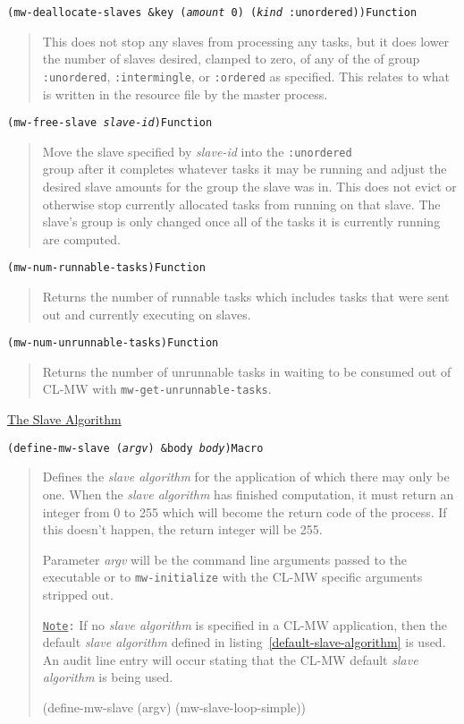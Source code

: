 \documentclass[titlepage,12pt]{book}
\newcommand{\phlabel}[1]{\phantomsection\label{#1}}
\newcommand{\xsmall}{\latexhtml{\small}{}}
\newcommand{\xnormalsize}{\latexhtml{\normalsize}{}}
\newcommand{\clmw}{\xsmall\textsc{CL-MW}\xnormalsize\xspace}
\newcommand{\sa}{\textit{slave algorithm}\xspace}
\newcommand{\un}{\texttt{:unordered}\xspace}
\newcommand{\inter}{\texttt{:intermingle}\xspace}
\newcommand{\ord}{\texttt{:ordered}\xspace}
\newcommand{\func}[1]{\mbox{\texttt{#1}}\xspace}
\newcommand{\Note}{\texttt{\underline{Note}:}\xspace}
\newcommand{\apiheader}[1]{\begin{center}\underline{#1}\end{center}}
\newcommand{\apifunc}[2]{\noindent\xsmall\texttt{(#1)}\hspace*{\fill}\xnormalsize\texttt{#2}}
\newenvironment{apientry}[2]
	{\apifunc{#1}{#2}\begin{quotation}}
	{\end{quotation}}
\begin{document}
\begin{apientry}
{mw-deallocate-slaves \&key (\emph{amount} 0) (\emph{kind} :unordered)}
{Function}
This does not stop any slaves from processing any tasks, but it does lower
the number of slaves desired, clamped to zero, of any of the of group
\un, \inter, or \ord as specified. This relates to what is written in the
resource file by the master process.
\end{apientry}

\begin{apientry}
{mw-free-slave \emph{slave-id}}
{Function}
Move the slave specified by \emph{slave-id} into the \un \\ group
after it completes whatever tasks it may be running and adjust the
desired slave amounts for the group the slave was in. This does not
evict or otherwise stop currently allocated tasks from running on
that slave. The slave's group is only changed once all of the tasks
it is currently running are computed.  \end{apientry}

\begin{apientry}
{mw-num-runnable-tasks}
{Function}
Returns the number of runnable tasks which includes tasks that were
sent out and currently executing on slaves.
\end{apientry}

\begin{apientry}
{mw-num-unrunnable-tasks}
{Function}
Returns the number of unrunnable tasks in waiting to be consumed out
of \clmw with \func{mw-get-unrunnable-tasks}.
\end{apientry}

\apiheader{\phlabel{slave-algorithm-api}The Slave Algorithm}
\begin{apientry}
{define-mw-slave (\emph{argv}) \&body \emph{body}}
{Macro}
Defines the \sa for the application of which there may only be one.
When the \sa has finished computation, it must return an integer from 0 to 255
which will become the return code of the process. If this doesn't happen,
the return integer will be 255.

Parameter \emph{argv} will be the command line arguments passed to
the executable or to \func{mw-initialize} with the \clmw specific
arguments stripped out.

\Note If no \sa is specified in a \clmw application, then the default \sa
defined in listing~\ref{default-slave-algorithm} is used. An audit line
entry will occur stating that the \clmw default \sa is being used.

\begin{lisp}[label=default-slave-algorithm,caption=Default Slave Algorithm]
(define-mw-slave (argv)
  (mw-slave-loop-simple))
\end{lisp}

\end{apientry}
\end{document}
